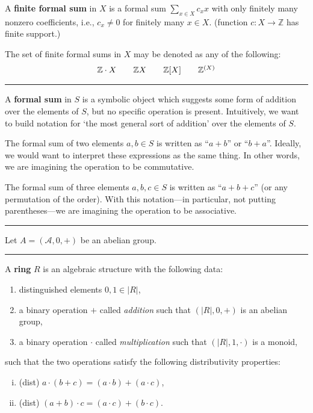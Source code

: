 \documentclass[12pt]{article}
\newcommand{\keyword}[1]{\textbf{#1}}
\newcommand{\sepline}{\rule{\textwidth}{0.4pt}}
\theoremstyle{definition}
\newcommand{\Z}{\mathbb{Z}}
\renewcommand{\AA}{\mathcal{A}}
\newcommand{\<}{\left\langle}
\renewcommand{\>}{\right\rangle}
\renewcommand{\_}[1]{{_{#1}}}
\begin{document}
A \keyword{finite formal sum} in $X$ is a formal sum $\sum_{x \in X} c_x x$ with only finitely many nonzero coefficients, i.e., $c_x \ne 0$ for finitely many $x \in X$.
(function $c : X \to \Z$ has finite support.)

The set of finite formal sums in $X$ may be denoted as any of the following:
\[\arraycolsep=1em
    \begin{array}{cccc}
        \Z \cdot X & \Z X & \Z[X] & \Z^{(X)}
    \end{array}
\]



\sepline

A \keyword{formal sum} in $S$ is a symbolic object which suggests some form of addition over the elements of $S$, but no specific operation is present.
Intuitively, we want to build notation for `the most general sort of addition' over the elements of $S$.



The formal sum of two elements $a, b \in S$ is written as ``$a + b$'' or ``$b + a$''.
Ideally, we would want to interpret these expressions as the same thing.
In other words, we are imagining the operation to be commutative.

The formal sum of three elements $a, b, c \in S$ is written as ``$a + b + c$'' (or any permutation of the order).
With this notation---in particular, not putting parentheses---we are imagining the operation to be associative.


\sepline

Let $A = (\AA, 0, +)$ be an abelian group.




\newpage
\sepline

A \keyword{ring} $R$ is an algebraic structure with the following data:
\begin{enumerate}[(1)]
    \item distinguished elements $0, 1 \in |R|$,
    \item a binary operation $+$ called \emph{addition} such that $(|R|, 0, +)$ is an abelian group,
    \item a binary operation $\cdot$ called \emph{multiplication} such that $(|R|, 1, \cdot)$ is a monoid,
\end{enumerate}
such that the two operations satisfy the following distributivity properties:
\begin{enumerate}[(i)]
    \item (dist) $a \cdot (b + c) = (a \cdot b) + (a \cdot c)$,
    \item (dist) $(a + b) \cdot c = (a \cdot c) + (b \cdot c)$.
\end{enumerate}
\end{document}
